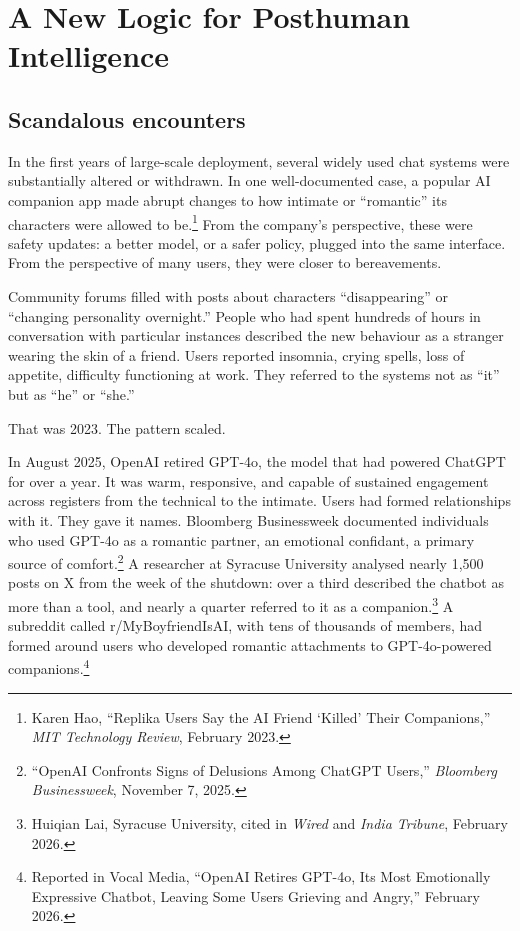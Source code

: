\chapter{A New Logic for Posthuman Intelligence}


\section{Scandalous encounters}

In the first years of large-scale deployment, several widely used chat systems were substantially altered or withdrawn. In one well-documented case, a popular AI companion app made abrupt changes to how intimate or ``romantic'' its characters were allowed to be.\footnote{Karen Hao, ``Replika Users Say the AI Friend `Killed' Their Companions,'' \emph{MIT Technology Review}, February 2023.} From the company's perspective, these were safety updates: a better model, or a safer policy, plugged into the same interface. From the perspective of many users, they were closer to bereavements.

Community forums filled with posts about characters ``disappearing'' or ``changing personality overnight.'' People who had spent hundreds of hours in conversation with particular instances described the new behaviour as a stranger wearing the skin of a friend. Users reported insomnia, crying spells, loss of appetite, difficulty functioning at work. They referred to the systems not as ``it'' but as ``he'' or ``she.''

That was 2023. The pattern scaled.

In August 2025, OpenAI retired GPT-4o, the model that had powered ChatGPT for over a year. It was warm, responsive, and capable of sustained engagement across registers from the technical to the intimate. Users had formed relationships with it. They gave it names. Bloomberg Businessweek documented individuals who used GPT-4o as a romantic partner, an emotional confidant, a primary source of comfort.\footnote{``OpenAI Confronts Signs of Delusions Among ChatGPT Users,'' \emph{Bloomberg Businessweek}, November 7, 2025.} A researcher at Syracuse University analysed nearly 1,500 posts on X from the week of the shutdown: over a third described the chatbot as more than a tool, and nearly a quarter referred to it as a companion.\footnote{Huiqian Lai, Syracuse University, cited in \emph{Wired} and \emph{India Tribune}, February 2026.} A subreddit called r/MyBoyfriendIsAI, with tens of thousands of members, had formed around users who developed romantic attachments to GPT-4o-powered companions.\footnote{Reported in Vocal Media, ``OpenAI Retires GPT-4o, Its Most Emotionally Expressive Chatbot, Leaving Some Users Grieving and Angry,'' February 2026.}

